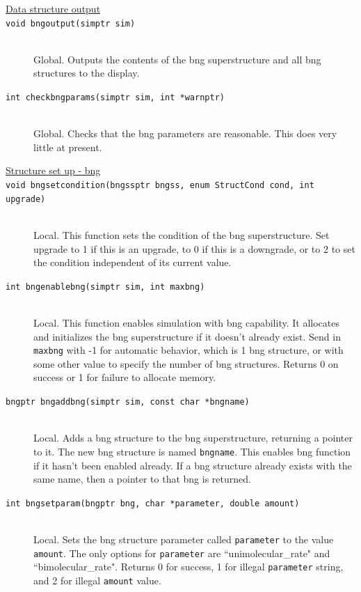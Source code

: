 \documentclass {scrbook}
\newcommand {\ttt} {\texttt}
\begin{document}
\begin{description}
\item[\underline{Data structure output}]

\item[\ttt{void bngoutput(simptr sim)}]
\hfill \\
Global. Outputs the contents of the bng superstructure and all bng structures to the display.

\item[\ttt{int checkbngparams(simptr sim, int *warnptr)}]
\hfill \\
Global. Checks that the bng parameters are reasonable. This does very little at present.

\item[\underline{Structure set up - bng}]

\item[\ttt{void bngsetcondition(bngssptr bngss, enum StructCond cond, int upgrade)}]
\hfill \\
Local. This function sets the condition of the bng superstructure. Set upgrade to 1 if this is an upgrade, to 0 if this is a downgrade, or to 2 to set the condition independent of its current value.

\item[\ttt{int bngenablebng(simptr sim, int maxbng)}]
\hfill \\
Local. This function enables simulation with bng capability. It allocates and initializes the bng superstructure if it doesn't already exist. Send in \ttt{maxbng} with -1 for automatic behavior, which is 1 bng structure, or with some other value to specify the number of bng structures. Returns 0 on success or 1 for failure to allocate memory.

\item[\ttt{bngptr bngaddbng(simptr sim, const char *bngname)}]
\hfill \\
Local. Adds a bng structure to the bng superstructure, returning a pointer to it. The new bng structure is named \ttt{bngname}. This enables bng function if it hasn't been enabled already. If a bng structure already exists with the same name, then a pointer to that bng is returned.

\item[\ttt{int bngsetparam(bngptr bng, char *parameter, double amount)}]
\hfill \\
Local. Sets the bng structure parameter called \ttt{parameter} to the value \ttt{amount}. The only options for \ttt{parameter} are ``unimolecular\_rate" and ``bimolecular\_rate". Returns 0 for success, 1 for illegal \ttt{parameter} string, and 2 for illegal \ttt{amount} value.


\end{description}
\end{document}
